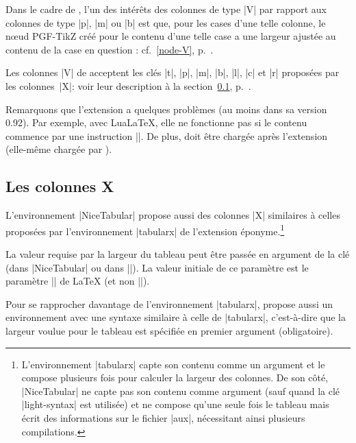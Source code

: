 \documentclass[dvipsnames]{article}
\begin{document}
\medskip
Dans le cadre de
, l'un des intérêts des colonnes de type |V| par rapport aux
colonnes de type |p|, |m| ou |b| est que, pour les cases d'une telle colonne,
le nœud PGF-TikZ créé pour le contenu d'une telle case a une largeur ajustée
au contenu de la case en question : cf.~\ref{node-V}, p.~\pageref{node-V}. 


\medskip
Les colonnes |V| de  acceptent les clés |t|, |p|, |m|, |b|, |l|,
|c| et |r| proposées par les colonnes~|X|: voir leur description à la section~\ref{colonne-X},
p.~\pageref{colonne-X}. 

\medskip
Remarquons que l'extension  a quelques problèmes (au moins dans sa
version 0.92). Par exemple, avec LuaLaTeX, elle ne fonctionne pas si le contenu
commence par une instruction |\color|. De plus,  doit être chargée après
l'extension  (elle-même chargée par ).


\subsection{Les colonnes X}

\label{colonne-X}

L'environnement |{NiceTabular}| propose aussi des colonnes |X| similaires à
celles proposées par l'environnement |{tabularx}| de l'extension
éponyme.\footnote{L'environnement |{tabularx}| capte son contenu comme un
  argument et le compose plusieurs fois pour calculer la largeur des colonnes.
  De son côté, |{NiceTabular}| ne capte pas son contenu comme argument (sauf
  quand la clé |light-syntax| est utilisée) et ne compose qu'une seule fois le
  tableau mais écrit des informations sur le fichier |aux|, nécessitant ainsi
  plusieurs compilations.}

La valeur requise par la largeur du tableau peut être passée en argument de la
clé  (dans |{NiceTabular}| ou dans |\NiceMatrixOptions|). La
valeur initiale de ce paramètre est le paramètre |\linewidth| de LaTeX (et non
|\textwidth|).

Pour se rapprocher davantage de l'environnement |{tabularx}|, 
propose aussi un environnement  avec une syntaxe
similaire à celle de |{tabularx}|, c'est-à-dire que la largeur voulue pour le
tableau est spécifiée en premier argument (obligatoire).
\end{document}

